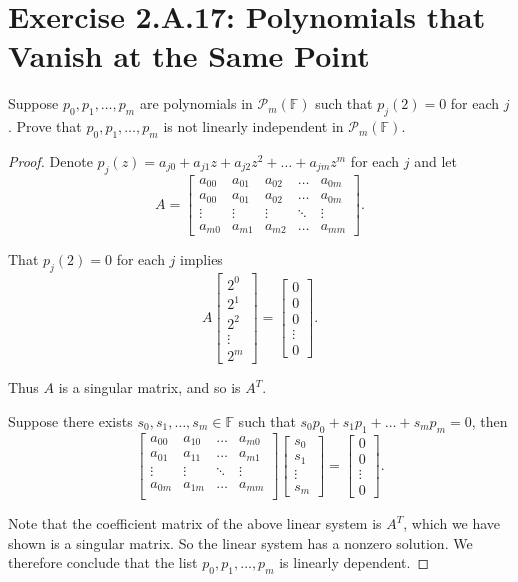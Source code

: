 \section{Exercise 2.A.17: Polynomials that Vanish at the Same Point}\label{Exercise 2.A.17}
Suppose $p_0, p_1,\dots, p_m$ are polynomials in $\mathcal{P}_m(\mathbb{F})$ such that $p_j(2)=0$ for each $j$. Prove that $p_0, p_1,\dots, p_m$ is not linearly independent in $\mathcal{P}_m(\mathbb{F})$.
\begin{proof}
Denote $p_j(z)=a_{j0}+a_{j1}z+a_{j2}z^2+\dots+a_{jm}z^m$ for each $j$ and let\[
A=\begin{bmatrix}
a_{00} & a_{01} & a_{02} & \dots & a_{0m}\\
a_{00} & a_{01} & a_{02} & \dots & a_{0m}\\
\vdots & \vdots  & \vdots & \ddots &\vdots\\
a_{m0} & a_{m1} & a_{m2} & \dots & a_{mm}
\end{bmatrix}.
\]

That $p_j(2)=0$ for each $j$ implies\[
A\begin{bmatrix}
2^0\\
2^1\\
2^2\\
\vdots\\
2^m
\end{bmatrix}=\begin{bmatrix}
0\\
0\\
0\\
\vdots\\
0
\end{bmatrix}.
\]

Thus $A$ is a singular matrix, and so is $A^T$.

Suppose there exists $s_0,s_1,\dots,s_m\in\mathbb{F}$ such that $s_0p_0+s_1p_1+\dots+s_mp_m=0$, then\[
\begin{bmatrix}
a_{00} & a_{10} & \dots & a_{m0}\\
a_{01} & a_{11} & \dots & a_{m1}\\
\vdots  & \vdots & \ddots &\vdots\\
a_{0m} & a_{1m} & \dots & a_{mm}\\
\end{bmatrix}
\begin{bmatrix}
s_0\\
s_1\\
\vdots\\
s_m
\end{bmatrix}=\begin{bmatrix}
0\\
0\\
\vdots\\
0
\end{bmatrix}.
\]

Note that the coefficient matrix of the above linear system is $A^T$, which we have shown is a singular matrix. So the linear system has a nonzero solution. We therefore conclude that the list $p_0,p_1,\dots,p_m$ is linearly dependent.
\end{proof}

